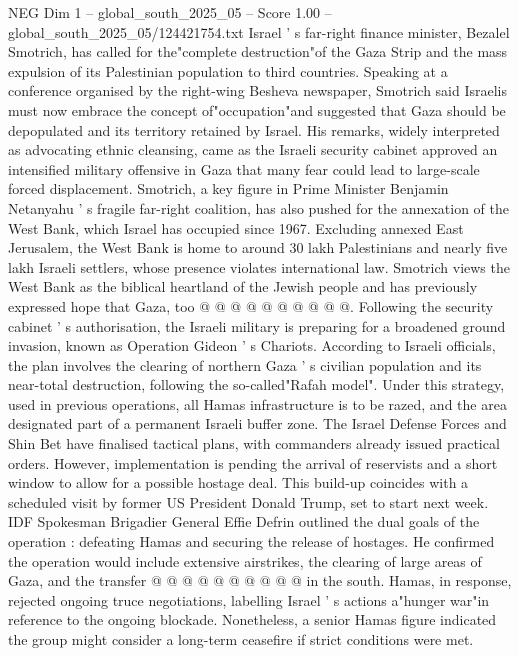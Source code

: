 \begin{textsample}{NEG Dim 1 – global\_south\_2025\_05 – Score 1.00 – global\_south\_2025\_05/124421754.txt}  \label{ex:f1_neg_173}
Israel ' s far-right finance minister, Bezalel Smotrich, has called for the"complete destruction"of the Gaza Strip and the mass expulsion of its Palestinian population to third countries.
Speaking at a conference organised by the right-wing Besheva newspaper, Smotrich said Israelis must now embrace the concept of"occupation"and suggested that Gaza should be depopulated and its territory retained by Israel.
His remarks, widely interpreted as advocating ethnic cleansing, came as the Israeli security cabinet approved an intensified military offensive in Gaza that many fear could lead to large-scale forced displacement.
Smotrich, a key figure in Prime Minister Benjamin Netanyahu ' s fragile far-right coalition, has also pushed for the annexation of the West Bank, which Israel has occupied since 1967.
Excluding annexed East Jerusalem, the West Bank is home to around 30 lakh Palestinians and nearly five lakh Israeli settlers, whose presence violates international law.
Smotrich views the West Bank as the biblical heartland of the Jewish people and has previously expressed hope that Gaza, too @ @ @ @ @ @ @ @ @ @.
Following the security cabinet ' s authorisation, the Israeli military is preparing for a broadened ground invasion, known as Operation Gideon ' s Chariots.
According to Israeli officials, the plan involves the clearing of northern Gaza ' s civilian population and its near-total destruction, following the so-called"Rafah model".
Under this strategy, used in previous operations, all Hamas infrastructure is to be razed, and the area designated part of a permanent Israeli buffer zone.
The Israel Defense Forces and Shin Bet have finalised tactical plans, with commanders already issued practical orders.
However, implementation is pending the arrival of reservists and a short window to allow for a possible hostage deal.
This build-up coincides with a scheduled visit by former US President Donald Trump, set to start next week.
IDF Spokesman Brigadier General Effie Defrin outlined the dual goals of the operation : defeating Hamas and securing the release of hostages.
He confirmed the operation would include extensive airstrikes, the clearing of large areas of Gaza, and the transfer @ @ @ @ @ @ @ @ @ @ in the south.
Hamas, in response, rejected ongoing truce negotiations, labelling Israel ' s actions a"hunger war"in reference to the ongoing blockade.
Nonetheless, a senior Hamas figure indicated the group might consider a long-term ceasefire if strict conditions were met.

\end{textsample}
